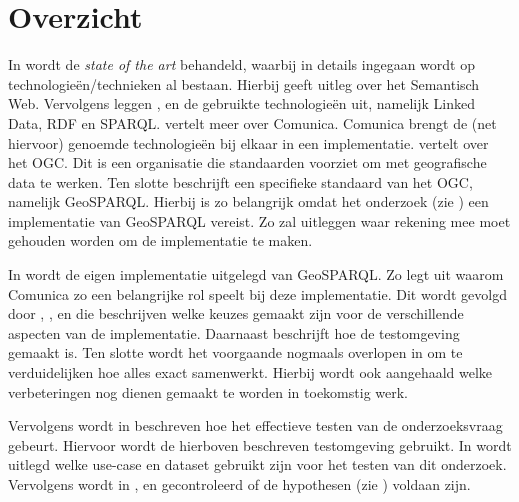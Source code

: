 \section{Overzicht}

In  wordt de \textit{state of the art} behandeld, waarbij in details ingegaan wordt op technologieën/technieken al bestaan. Hierbij geeft  uitleg over het Semantisch Web. Vervolgens leggen ,  en  de gebruikte technologieën uit, namelijk Linked Data, RDF en SPARQL.  vertelt meer over Comunica. Comunica brengt de (net hiervoor) genoemde technologieën bij elkaar in een implementatie.  vertelt over het OGC. Dit is een organisatie die standaarden voorziet om met geografische data te werken. Ten slotte beschrijft  een specifieke standaard van het OGC, namelijk GeoSPARQL. Hierbij is  zo belangrijk omdat het onderzoek (zie ) een implementatie van GeoSPARQL vereist. Zo zal  uitleggen waar rekening mee moet gehouden worden om de implementatie te maken.

In  wordt de eigen implementatie uitgelegd van GeoSPARQL. Zo legt  uit waarom Comunica zo een belangrijke rol speelt bij deze implementatie. Dit wordt gevolgd door , ,  en  die beschrijven welke keuzes gemaakt zijn voor de verschillende aspecten van de implementatie. Daarnaast beschrijft  hoe de testomgeving gemaakt is. Ten slotte wordt het voorgaande nogmaals overlopen in  om te verduidelijken hoe alles exact samenwerkt. Hierbij wordt ook aangehaald welke verbeteringen nog dienen gemaakt te worden in toekomstig werk.

Vervolgens wordt in  beschreven hoe het effectieve testen van de onderzoeksvraag gebeurt. Hiervoor wordt de hierboven beschreven testomgeving gebruikt. In  wordt uitlegd welke use-case en dataset gebruikt zijn voor het testen van dit onderzoek. Vervolgens wordt in ,  en  gecontroleerd of de hypothesen (zie ) voldaan zijn.

